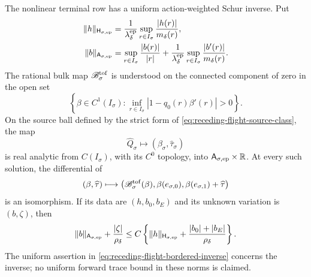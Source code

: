 \begin{theorem}
The nonlinear terminal row has a uniform action-weighted Schur inverse.
Put
\begin{align}
 \|h\|_{\mathsf H_{\sigma,{\rm ep}}}
 &=\frac1{\lambda_\delta^{\rm ep}}
   \sup_{r\in I_\sigma}\frac{|h(r)|}{m_\delta(r)},\notag\\
\|b\|_{\mathsf A_{\sigma,{\rm ep}}}
 &=\sup_{r\in I_\sigma}\frac{|b(r)|}{|r|}
   +\frac1{\lambda_\delta^{\rm ep}}
      \sup_{r\in I_\sigma}\frac{|b'(r)|}{m_\delta(r)}.
                                                        \label{eq:receding-flight-linear-norms}
\end{align}
The rational bulk map \(\mathscr B_\sigma^{\rm tof}\) is understood on the
connected component of zero in the open set
\begin{equation}
 \left\{\beta\in C^1(I_\sigma):
  \inf_{r\in I_\sigma}|1-q_0(r)\beta'(r)|>0\right\}.
                                                        \label{eq:receding-flight-rational-domain}
\end{equation}
On the source ball defined by the strict form of
\cref{eq:receding-flight-source-class}, the map
\[
 \widehat Q_\sigma\longmapsto
       (\beta_\sigma,\widehat\tau_\sigma)
\]
is real analytic from \(C(I_\sigma)\), with its \(C^0\) topology, into
\(\mathsf A_{\sigma,{\rm ep}}\times\mathbb R\).  At every such solution, the
differential of
\begin{equation}
 (\beta,\widehat\tau)\longmapsto
 \left(\mathscr B_\sigma^{\rm tof}(\beta),
       \beta(e_{\sigma,0}),
       \beta(e_{\sigma,1})+\widehat\tau\right)    \label{eq:receding-flight-bordered-map}
\end{equation}
is an isomorphism.  If its data are \((h,b_0,b_E)\) and its unknown
variation is \((b,\zeta)\), then
\begin{equation}
 \|b\|_{\mathsf A_{\sigma,{\rm ep}}}
       +\frac{|\zeta|}{\rho_\delta}
 \le C\left\{
   \|h\|_{\mathsf H_{\sigma,{\rm ep}}}
       +\frac{|b_0|+|b_E|}{\rho_\delta}\right\}.  \label{eq:receding-flight-bordered-inverse}
\end{equation}
The uniform assertion in
\cref{eq:receding-flight-bordered-inverse} concerns the inverse; no uniform
forward trace bound in these norms is claimed.


\end{theorem}
